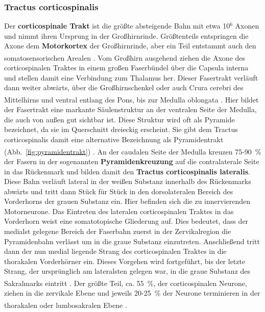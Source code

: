 \documentclass[12pt,a4paper,pdftex]{article}
\begin{document}
\subsubsection{Tractus corticospinalis}  \label{subsubsec:corticospinalis}
Der \textbf{corticospinale Trakt} ist die größte absteigende Bahn mit etwa 10$^{6}$ Axonen und nimmt ihren Ursprung in der Großhirnrinde. Größtenteils entspringen die Axone dem \textbf{Motorkortex} der Großhirnrinde, aber ein Teil entstammt auch den somatosensorischen Arealen \textsuperscript{\cite[14]{neurowissenschaften_baer}}. 
Vom Großhirn ausgehend ziehen die Axone des corticospinalen Traktes in einem großen Faserbündel über die Capsula interna und stellen damit eine Verbindung zum Thalamus her. Dieser Fasertrakt verläuft dann weiter abwärts, über die Großhirnschenkel oder auch Crura cerebri des Mittelhirns und ventral entlang des Pons, bis zur Medulla oblongata \textsuperscript{\cite[8]{crossman2014neuroanatomy}}. Hier bildet der Fasertrakt eine markante Säulenstruktur an der ventralen Seite der Medulla, die auch von außen gut sichtbar ist. Diese Struktur wird oft als Pyramide bezeichnet, da sie im Querschnitt dreieckig erscheint. Sie gibt dem Tractus corticospinalis damit eine alternative Bezeichnung als Pyramidentrakt (Abb.~\ref{fig:pyramidentrakt}) \textsuperscript{\cite[14]{neurowissenschaften_baer}}. An der caudalen Seite der Medulla kreuzen 75-90~\% der Fasern in der sogenannten \textbf{Pyramidenkreuzung} auf die contralaterale Seite in das Rückenmark und bilden damit den \textbf{Tractus corticospinalis lateralis}. Diese Bahn verläuft lateral in der weißen Substanz innerhalb des Rückenmarks abwärts und tritt dann Stück für Stück in den dorsolateralen Bereich des Vorderhorns der grauen Substanz ein. Hier befinden sich die zu innervierenden Motorneurone. Das Eintreten des lateralen corticospinalen Traktes in das Vorderhorn weist eine somatotopische Gliederung auf. Dies bedeutet, dass der medialst gelegene Bereich der Faserbahn zuerst in der Zervikalregion die Pyramidenbahn verlässt um in die graue Substanz einzutreten. Anschließend tritt dann der nun medial liegende Strang des corticospinalen Traktes in die thorakalen Vorderhörner ein. Dieses Vorgehen wird fortgeführt, bis der letzte Strang, der ursprünglich am lateralsten gelegen war, in die graue Substanz des Sakralmarks eintritt \textsuperscript{\cite[3]{trepel2011neuroanatomie}}. Der größte Teil, ca. 55~\%, der corticospinalen Neurone, ziehen in die zervikale Ebene und jeweils 20-25~\% der Neurone terminieren in der thorakalen oder lumbosakralen Ebene \textsuperscript{\cite[8]{crossman2014neuroanatomy}}. \\
\end{document}
